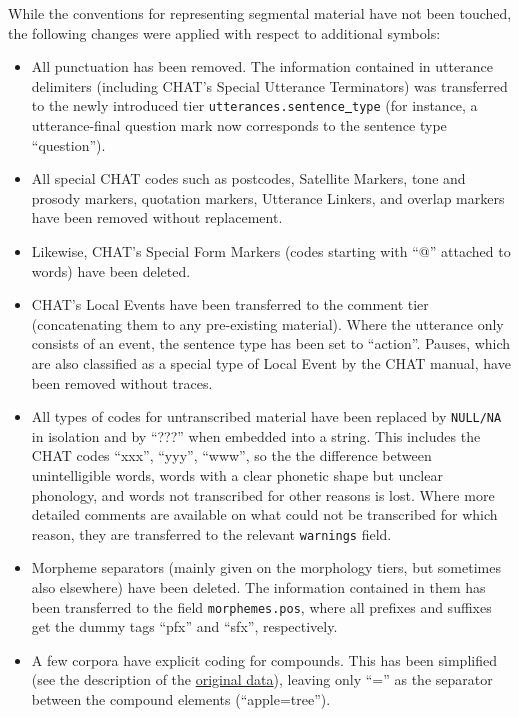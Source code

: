 \documentclass[a4paper, 11pt]{book}
\newcommand{\und}{\underline{{ }}\hspace{0.2mm}}	%
\begin{document}
While the conventions for representing segmental material have not been touched, the following changes were applied with respect to additional symbols: 

\begin{itemize}
	\item All punctuation has been removed. The information contained in utterance delimiters (including CHAT’s Special Utterance Terminators) was transferred to the newly introduced tier 
		\texttt{utterances.sentence\und type} (for instance, a utterance-final question mark now corresponds to the sentence type “question”). 
	\item All special CHAT codes such as postcodes, Satellite Markers, tone and prosody markers, quotation markers, Utterance Linkers, and overlap markers have been removed without replacement. 
	\item Likewise, CHAT’s Special Form Markers (codes starting with “@” attached to words) have been deleted. 
	\item CHAT’s Local Events have been transferred to the comment tier (concatenating them to any pre-existing material). Where the utterance only consists of an event, the sentence type has been set to “action”. 
		Pauses, which are also classified as a special type of Local Event by the CHAT manual, have been removed without traces. 
	\item All types of codes for untranscribed material have been replaced by \texttt{NULL/NA} in isolation and by “???” when embedded into a string. This includes the CHAT codes “xxx”, “yyy”, “www”, so the the difference 
		between unintelligible words, words with a clear phonetic shape but unclear phonology, and words not transcribed for other reasons is lost. Where more detailed comments are available on what could not be transcribed
		for which reason, they are transferred to the relevant \texttt{warnings} field. 
	\item Morpheme separators (mainly given on the morphology tiers, but sometimes also elsewhere) have been deleted. The information contained in them has been transferred to the field \texttt{morphemes.pos}, 
		where all prefixes and suffixes get the dummy tags “pfx” and “sfx”, respectively. 
	\item A few corpora have explicit coding for compounds. This has been simplified (see the description of the \hyperref[cha:Data sources]{original data}), leaving only “=” as 
		the separator between the compound elements (“apple=tree”). 
\end{itemize}
\end{document}
